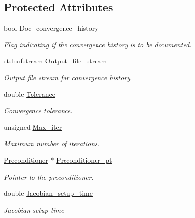 \subsection*{Protected Attributes}
\begin{DoxyCompactItemize}
\item 
bool \hyperlink{classoomph_1_1IterativeLinearSolver_aeb0fbe103e721196232260230abb1997}{Doc\+\_\+convergence\+\_\+history}
\begin{DoxyCompactList}\small\item\em Flag indicating if the convergence history is to be documented. \end{DoxyCompactList}\item 
std\+::ofstream \hyperlink{classoomph_1_1IterativeLinearSolver_ad4d6766bec67399c29392e6540b91dd9}{Output\+\_\+file\+\_\+stream}
\begin{DoxyCompactList}\small\item\em Output file stream for convergence history. \end{DoxyCompactList}\item 
double \hyperlink{classoomph_1_1IterativeLinearSolver_a46dd6b0243c734a77afce3c44cf4597d}{Tolerance}
\begin{DoxyCompactList}\small\item\em Convergence tolerance. \end{DoxyCompactList}\item 
unsigned \hyperlink{classoomph_1_1IterativeLinearSolver_a9bdc42768d009b093fd7bc23647dc989}{Max\+\_\+iter}
\begin{DoxyCompactList}\small\item\em Maximum number of iterations. \end{DoxyCompactList}\item 
\hyperlink{classoomph_1_1Preconditioner}{Preconditioner} $\ast$ \hyperlink{classoomph_1_1IterativeLinearSolver_a55111d8d76589944d81d13b5e15f7248}{Preconditioner\+\_\+pt}
\begin{DoxyCompactList}\small\item\em Pointer to the preconditioner. \end{DoxyCompactList}\item 
double \hyperlink{classoomph_1_1IterativeLinearSolver_a82a12e45c78e910b46e9d0935beb8f0d}{Jacobian\+\_\+setup\+\_\+time}
\begin{DoxyCompactList}\small\item\em Jacobian setup time. \end{DoxyCompactList}\item 

\end{DoxyCompactItemize}

